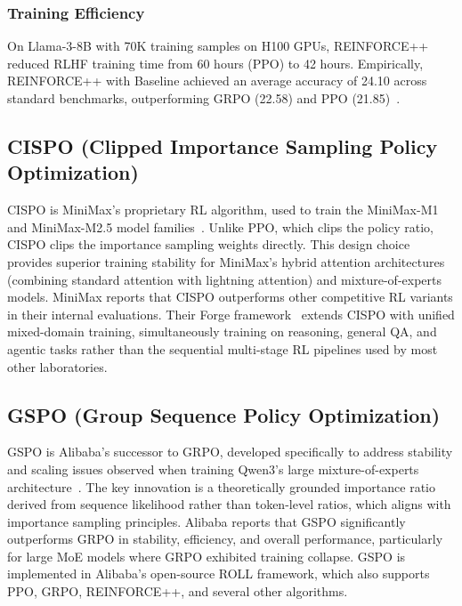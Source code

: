 \documentclass[12pt]{article}
\begin{document}
\subsubsection{Training Efficiency}

On Llama-3-8B with 70K training samples on H100 GPUs, REINFORCE++ reduced RLHF training time from 60 hours (PPO) to 42 hours. Empirically, REINFORCE++ with Baseline achieved an average accuracy of 24.10 across standard benchmarks, outperforming GRPO (22.58) and PPO (21.85)~\cite{Hu2025Reinforce}.

\subsection{CISPO (Clipped Importance Sampling Policy Optimization)}

CISPO is MiniMax's proprietary RL algorithm, used to train the MiniMax-M1 and MiniMax-M2.5 model families~\cite{MiniMax2025M1}. Unlike PPO, which clips the policy ratio, CISPO clips the importance sampling weights directly. This design choice provides superior training stability for MiniMax's hybrid attention architectures (combining standard attention with lightning attention) and mixture-of-experts models. MiniMax reports that CISPO outperforms other competitive RL variants in their internal evaluations. Their Forge framework~\cite{MiniMax2025Forge} extends CISPO with unified mixed-domain training, simultaneously training on reasoning, general QA, and agentic tasks rather than the sequential multi-stage RL pipelines used by most other laboratories.

\subsection{GSPO (Group Sequence Policy Optimization)}

GSPO is Alibaba's successor to GRPO, developed specifically to address stability and scaling issues observed when training Qwen3's large mixture-of-experts architecture~\cite{Qwen2025GSPO}. The key innovation is a theoretically grounded importance ratio derived from sequence likelihood rather than token-level ratios, which aligns with importance sampling principles. Alibaba reports that GSPO significantly outperforms GRPO in stability, efficiency, and overall performance, particularly for large MoE models where GRPO exhibited training collapse. GSPO is implemented in Alibaba's open-source ROLL framework, which also supports PPO, GRPO, REINFORCE++, and several other algorithms.
\end{document}
